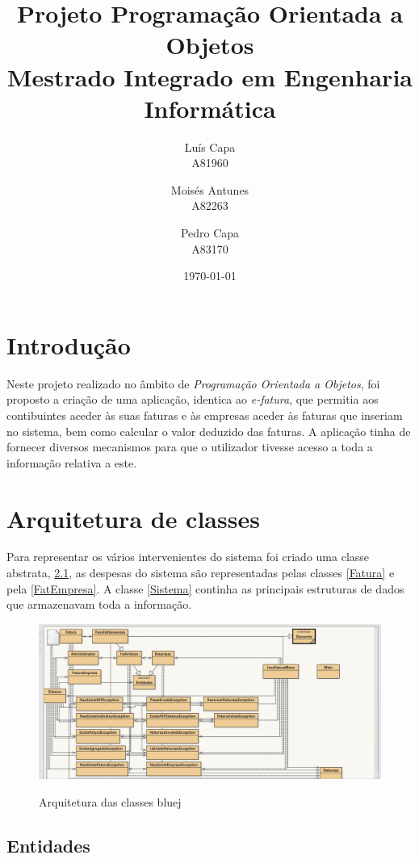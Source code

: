 \documentclass[10pt, a4paper]{report}
\title{Projeto Programação Orientada a Objetos \\ Mestrado Integrado em Engenharia Informática}
\author{Luís Capa \\ A81960 
	\and 
	Moisés Antunes \\ A82263
	\and
	Pedro Capa \\ A83170
}
\date{\today}
\begin{document}
\maketitle
\tableofcontents

\chapter{Introdução}\label{introducao}

Neste projeto realizado no âmbito de \emph{Programação Orientada a Objetos}, foi proposto a criação de uma aplicação, identica ao \emph{e-fatura}, que permitia aos contibuintes aceder às suas faturas e às empresas aceder às faturas que inseriam no sistema, bem como calcular o valor deduzido das faturas. A aplicação tinha de fornecer diversos mecanismos para que o utilizador tivesse acesso a toda a informação relativa a este.

\chapter{Arquitetura de classes}\label{Arquitetura}

Para representar os vários intervenientes do sistema foi criado uma classe abstrata, \ref{entidades}, as despesas do sistema são representadas pelas classes \ref{Fatura} e pela \ref{FatEmpresa}. A classe \ref{Sistema} continha as principais estruturas de dados que armazenavam toda a informação.

\begin{figure}[h]
\caption{Arquitetura das classes bluej}
\centering
\includegraphics{classes}
\label{menu0}
\end{figure}

\section{Entidades}\label{entidades}
\end{document}
